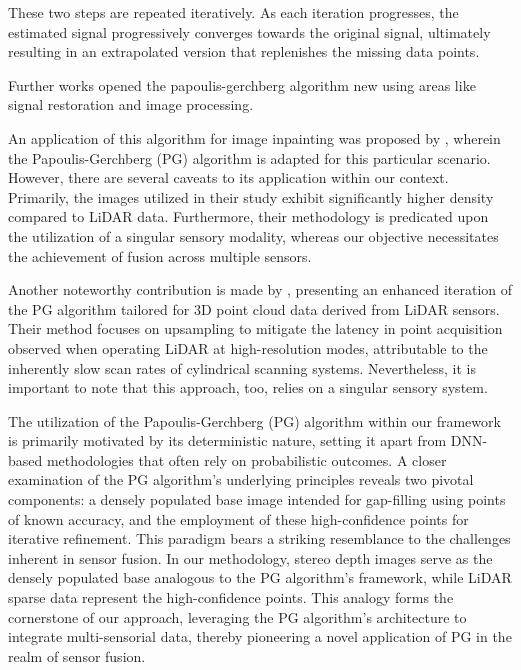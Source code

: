 \documentclass[conference]{IEEEtran}
\begin{document}
These two steps are repeated iteratively. As each iteration progresses, the estimated signal progressively converges towards the original signal, ultimately resulting in an extrapolated version that replenishes the missing data points.

Further works opened the papoulis-gerchberg algorithm new using areas like signal restoration and image processing.

An application of this algorithm for image inpainting was proposed by \cite{pg-image-inpaint-2009}, wherein the Papoulis-Gerchberg (PG) algorithm is adapted for this particular scenario. However, there are several caveats to its application within our context. Primarily, the images utilized in their study exhibit significantly higher density compared to LiDAR data. Furthermore, their methodology is predicated upon the utilization of a singular sensory modality, whereas our objective necessitates the achievement of fusion across multiple sensors.

Another noteworthy contribution is made by \cite{ozbay2015high}, presenting an enhanced iteration of the PG algorithm tailored for 3D point cloud data derived from LiDAR sensors. Their method focuses on upsampling to mitigate the latency in point acquisition observed when operating LiDAR at high-resolution modes, attributable to the inherently slow scan rates of cylindrical scanning systems. Nevertheless, it is important to note that this approach, too, relies on a singular sensory system.

The utilization of the Papoulis-Gerchberg (PG) algorithm within our framework is primarily motivated by its deterministic nature, setting it apart from DNN-based methodologies that often rely on probabilistic outcomes. A closer examination of the PG algorithm's underlying principles reveals two pivotal components: a densely populated base image intended for gap-filling using points of known accuracy, and the employment of these high-confidence points for iterative refinement. This paradigm bears a striking resemblance to the challenges inherent in sensor fusion. In our methodology, stereo depth images serve as the densely populated base analogous to the PG algorithm's framework, while LiDAR sparse data represent the high-confidence points. This analogy forms the cornerstone of our approach, leveraging the PG algorithm's architecture to integrate multi-sensorial data, thereby pioneering a novel application of PG in the realm of sensor fusion.
\end{document}
